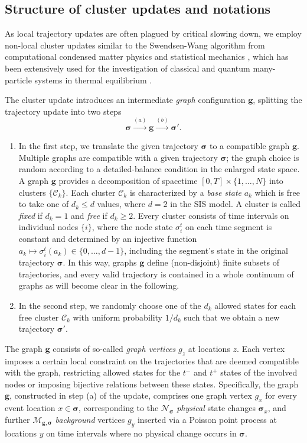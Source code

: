 \documentclass[english,10pt,aps,pra,twocolumn,superscriptaddress,floatfix,fleqn]{revtex4-2}
\newcommand{\mc}[1]{\mathcal{#1}}
\renewcommand{\vec}[1]{{\boldsymbol{#1}}}
\newcommand{\C} {\mc{C}}
\newcommand{\vg}{\vec{g}}
\newcommand{\vs}{\vec{\sigma}}
\newcommand{\Np}{\mc{N}}
\newcommand{\Nb}{\mc{M}}
\begin{document}
\subsection{Structure of cluster updates and notations}\label{sec:clusterUpdateIntro}
As local trajectory updates are often plagued by critical slowing down, we employ non-local cluster updates similar to the Swendsen-Wang algorithm from computational condensed matter physics and statistical mechanics \cite{Swendsen1987-58,Edwards1988-38}, which has been extensively used for the investigation of classical and quantum many-particle systems in thermal equilibrium \cite{Evertz1993-70,Sandvik1999-59,Evertz2003-52,Krauth2006}.

The cluster update introduces an intermediate \emph{graph} configuration $\vg$, splitting the trajectory update into two steps
\begin{equation}\label{eq:clusterUpdate-sgs}
	\vs \xrightarrow{(a)} \vg \xrightarrow{(b)} \vs'.
\end{equation}
\begin{enumerate}
 \item[(a)]
 In the first step, we translate the given trajectory $\vs$ to a compatible graph $\vg$. Multiple graphs are compatible with a given trajectory $\vs$; the graph choice is random according to a detailed-balance condition in the enlarged state space. A graph $\vg$ provides a decomposition of spacetime $[0,T]\times\{1,\dotsc,N\}$ into clusters $\{\C_k\}$. Each cluster $\C_k$ is characterized by a \emph{base state} $a_k$ which is free to take one of $d_k\leq d$ values, where $d=2$ in the SIS model. A cluster is called \emph{fixed} if $d_k=1$ and \emph{free} if $d_k\geq 2$. Every cluster consists of time intervals on individual nodes $\{i\}$, where the node state $\sigma_i^t$ on each time segment is constant and determined by an injective function $a_k\mapsto \sigma_i^t(a_k)\in\{0,\dotsc,d-1\}$, including the segment's state in the original trajectory $\vs$.
 In this way, graphs $\vg$ define (non-disjoint) finite subsets of trajectories, and every valid trajectory is contained in a whole continuum of graphs as will become clear in the following.
 \item[(b)]
 In the second step, we randomly choose one of the $d_k$ allowed states for each free cluster $\C_k$ with uniform probability $1/d_k$ such that we obtain a new trajectory $\vs'$.
\end{enumerate}

The graph $\vg$ consists of so-called \emph{graph vertices} $g_z$ at locations $z$. Each vertex imposes a certain local constraint on the trajectories that are deemed compatible with the graph, restricting allowed states for the $t^-$ and $t^+$ states of the involved nodes or imposing bijective relations between these states.
Specifically, the graph $\vg$, constructed in step (a) of the update, comprises one graph vertex $g_x$ for every event location $x\in\vs$, corresponding to the $\Np_\vs$ \emph{physical} state changes $\vs_x$, and further $\Nb_{\vg,\vs}$ \emph{background} vertices $g_y$ inserted via a Poisson point process at locations $y$ on time intervals where no physical change occurs in $\vs$.
\end{document}

